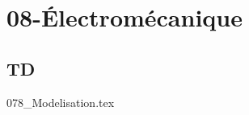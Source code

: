 \clearpage
\chapter{08-Électromécanique}

\section{TD}

\setcounter{question}{0}
{}
\graphicspath{{../08-Électromécanique/TD/078_Modelisation/images/}{../08-Électromécanique/TD/078_Modelisation/}{../Style/png/}}
{078_Modelisation.tex}

